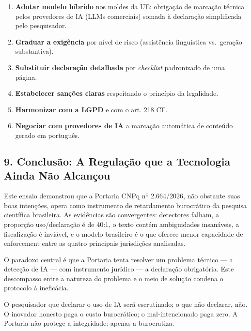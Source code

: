 \documentclass[
  12pt,
  a4paper,
  brazil
]{article}
\begin{document}
\begin{enumerate}
\def\labelenumi{\arabic{enumi}.}
\tightlist
\item
  \textbf{Adotar modelo híbrido} nos moldes da UE: obrigação de marcação
  técnica pelos provedores de IA (LLMs comerciais) somada à declaração
  simplificada pelo pesquisador.
\item
  \textbf{Graduar a exigência} por nível de risco (assistência
  linguística vs.~geração substantiva).
\item
  \textbf{Substituir declaração detalhada} por \emph{checklist}
  padronizado de uma página.
\item
  \textbf{Estabelecer sanções claras} respeitando o princípio da
  legalidade.
\item
  \textbf{Harmonizar com a LGPD} e com o art. 218 CF.
\item
  \textbf{Negociar com provedores de IA} a marcação automática de
  conteúdo gerado em português.
\end{enumerate}

\subsection{9. Conclusão: A Regulação que a Tecnologia Ainda Não
Alcançou}\label{conclusuxe3o-a-regulauxe7uxe3o-que-a-tecnologia-ainda-nuxe3o-alcanuxe7ou}

Este ensaio demonstrou que a Portaria CNPq nº 2.664/2026, não obstante
suas boas intenções, opera como instrumento de retardamento burocrático
da pesquisa científica brasileira. As evidências são convergentes:
detectores falham, a proporção uso/declaração é de 40:1, o texto contém
ambiguidades insanáveis, a fiscalização é inviável, e o modelo
brasileiro é o que oferece menor capacidade de enforcement entre as
quatro principais jurisdições analisadas.

O paradoxo central é que a Portaria tenta resolver um problema técnico
--- a detecção de IA --- com instrumento jurídico --- a declaração
obrigatória. Este descompasso entre a natureza do problema e o meio de
solução condena o protocolo à ineficácia.

O pesquisador que declarar o uso de IA será escrutinado; o que não
declarar, não. O inovador honesto paga o custo burocrático; o
mal-intencionado paga zero. A Portaria não protege a integridade: apenas
a burocratiza.
\end{document}
